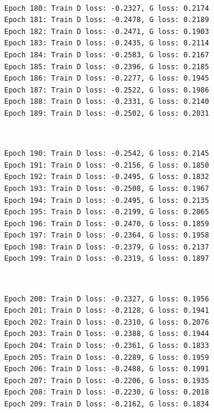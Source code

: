 \documentclass[11pt]{article}
\begin{document}
    \begin{center}
    \end{center}
    { \hspace*{\fill} \\}
    
    \begin{Verbatim}[commandchars=\\\{\}]
Epoch 180: Train D loss: -0.2327, G loss: 0.2174
Epoch 181: Train D loss: -0.2478, G loss: 0.2189
Epoch 182: Train D loss: -0.2471, G loss: 0.1903
Epoch 183: Train D loss: -0.2435, G loss: 0.2114
Epoch 184: Train D loss: -0.2583, G loss: 0.2167
Epoch 185: Train D loss: -0.2396, G loss: 0.2185
Epoch 186: Train D loss: -0.2277, G loss: 0.1945
Epoch 187: Train D loss: -0.2522, G loss: 0.1986
Epoch 188: Train D loss: -0.2331, G loss: 0.2140
Epoch 189: Train D loss: -0.2502, G loss: 0.2031

    \end{Verbatim}

    \begin{center}
    \end{center}
    { \hspace*{\fill} \\}
    
    \begin{Verbatim}[commandchars=\\\{\}]
Epoch 190: Train D loss: -0.2542, G loss: 0.2145
Epoch 191: Train D loss: -0.2156, G loss: 0.1850
Epoch 192: Train D loss: -0.2495, G loss: 0.1832
Epoch 193: Train D loss: -0.2508, G loss: 0.1967
Epoch 194: Train D loss: -0.2495, G loss: 0.2135
Epoch 195: Train D loss: -0.2199, G loss: 0.2065
Epoch 196: Train D loss: -0.2470, G loss: 0.1859
Epoch 197: Train D loss: -0.2364, G loss: 0.1958
Epoch 198: Train D loss: -0.2379, G loss: 0.2137
Epoch 199: Train D loss: -0.2319, G loss: 0.1897

    \end{Verbatim}

    \begin{center}
    \end{center}
    { \hspace*{\fill} \\}
    
    \begin{Verbatim}[commandchars=\\\{\}]
Epoch 200: Train D loss: -0.2327, G loss: 0.1956
Epoch 201: Train D loss: -0.2128, G loss: 0.1941
Epoch 202: Train D loss: -0.2310, G loss: 0.2076
Epoch 203: Train D loss: -0.2388, G loss: 0.1944
Epoch 204: Train D loss: -0.2361, G loss: 0.1833
Epoch 205: Train D loss: -0.2289, G loss: 0.1959
Epoch 206: Train D loss: -0.2488, G loss: 0.1991
Epoch 207: Train D loss: -0.2206, G loss: 0.1935
Epoch 208: Train D loss: -0.2230, G loss: 0.2018
Epoch 209: Train D loss: -0.2162, G loss: 0.1834

    \end{Verbatim}
\end{document}
